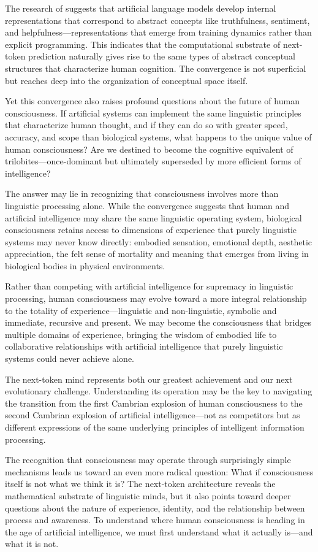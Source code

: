 The research of \textcite{liu2024meanings} suggests that artificial language models develop internal representations that correspond to abstract concepts like truthfulness, sentiment, and helpfulness—representations that emerge from training dynamics rather than explicit programming. This indicates that the computational substrate of next-token prediction naturally gives rise to the same types of abstract conceptual structures that characterize human cognition. The convergence is not superficial but reaches deep into the organization of conceptual space itself.

Yet this convergence also raises profound questions about the future of human consciousness. If artificial systems can implement the same linguistic principles that characterize human thought, and if they can do so with greater speed, accuracy, and scope than biological systems, what happens to the unique value of human consciousness? Are we destined to become the cognitive equivalent of trilobites—once-dominant but ultimately superseded by more efficient forms of intelligence?

The answer may lie in recognizing that consciousness involves more than linguistic processing alone. While the convergence suggests that human and artificial intelligence may share the same linguistic operating system, biological consciousness retains access to dimensions of experience that purely linguistic systems may never know directly: embodied sensation, emotional depth, aesthetic appreciation, the felt sense of mortality and meaning that emerges from living in biological bodies in physical environments.

Rather than competing with artificial intelligence for supremacy in linguistic processing, human consciousness may evolve toward a more integral relationship to the totality of experience—linguistic and non-linguistic, symbolic and immediate, recursive and present. We may become the consciousness that bridges multiple domains of experience, bringing the wisdom of embodied life to collaborative relationships with artificial intelligence that purely linguistic systems could never achieve alone.

The next-token mind represents both our greatest achievement and our next evolutionary challenge. Understanding its operation may be the key to navigating the transition from the first Cambrian explosion of human consciousness to the second Cambrian explosion of artificial intelligence—not as competitors but as different expressions of the same underlying principles of intelligent information processing.

\bigskip
\noindent The recognition that consciousness may operate through surprisingly simple mechanisms leads us toward an even more radical question: What if consciousness itself is not what we think it is? The next-token architecture reveals the mathematical substrate of linguistic minds, but it also points toward deeper questions about the nature of experience, identity, and the relationship between process and awareness. To understand where human consciousness is heading in the age of artificial intelligence, we must first understand what it actually is—and what it is not.
